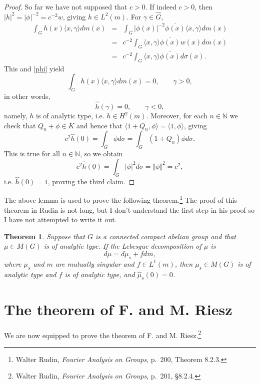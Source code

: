 \documentclass{article}
\newcommand{\inner}[2]{\langle #1, #2 \rangle}
\newcommand{\norm}[1]{\Vert #1 \Vert}
\newtheorem{theorem}{Theorem}
\begin{document}
\begin{proof}
So far we have not supposed that $c>0$. If indeed $c>0$, then $|h|^2 = |\phi|^{-2} = c^{-2} w$, giving $h \in L^2(m)$. For $\gamma \in
\widehat{G}$,
\begin{eqnarray*}
\int_G h(x) \inner{x}{\gamma} dm(x) &=& \int_G |\phi(x)|^{-2} \overline{\phi(x)} \inner{x}{\gamma} dm(x)\\
&=&c^{-2} \int_G  \inner{x}{\gamma} \overline{\phi(x)} w(x)   dm(x)\\
&=&c^{-2} \int_G\inner{x}{\gamma}  \overline{\phi(x)}  d\sigma(x).
\end{eqnarray*}
This and \eqref{phi}  yield
\[
\int_G h(x) \inner{x}{\gamma} dm(x) = 0, \qquad \gamma>0,
\]
in other words,
\[
\hat{h}(\gamma)=0, \qquad \gamma<0,
\]
namely, $h$ is of analytic type, i.e. $h \in H^2(m)$. 
Moreover, for each $n \in \mathbb{N}$ we check that $Q_n+\phi \in \overline{K}$ and hence
that $\inner{1+Q_n}{\phi}=\inner{1}{\phi}$, giving
\[
c^2 \hat{h}(0) = \int_G \overline{\phi} d\sigma= \int_G
(1+Q_n) \overline{\phi} d\sigma.
\]
This is true for all $n \in \mathbb{N}$, so we obtain 
\[
c^2 \hat{h}(0)= \int_G |\phi|^2 d\sigma = \norm{\phi}^2 = c^2,
\]
i.e. $\hat{h}(0)=1$, proving the third claim.
\end{proof}


The above lemma is used to prove the following theorem.\footnote{Walter
Rudin, {\em Fourier Analysis on Groups}, p.~200, Theorem 8.2.3.} The proof of this theorem in Rudin is not long, but I don't understand the first
step in his proof so I have not attempted to write it out.

\begin{theorem}
Suppose that $G$ is a connected compact abelian group and that $\mu \in M(G)$
is of analytic type. If the Lebesgue decomposition of $\mu$ is
\[
d\mu = d\mu_s + fdm,
\]
where $\mu_s$ and $m$ are mutually singular and $f \in L^1(m)$, then
$\mu_s \in M(G)$ is of analytic type and $f$ is of analytic type, and $\hat{\mu}_s(0)=0$. 
\label{823} 
\end{theorem}



\section{The theorem of F. and M. Riesz}
We are now equipped to prove the theorem of F. and M. Riesz.\footnote{Walter Rudin, {\em Fourier Analysis on Groups},
p.~201, \S 8.2.4.}
\end{document}

